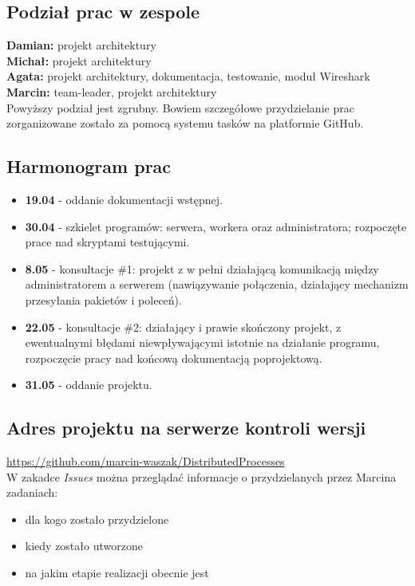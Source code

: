 \documentclass[paper=a4, fontsize=11pt]{scrartcl} %
\begin{document}
\subsection{Podział prac w zespole}
\textbf{Damian:} projekt architektury \\
\textbf{Michał:} projekt architektury \\
\textbf{Agata:} projekt architektury, dokumentacja, testowanie, moduł Wireshark \\
\textbf{Marcin:} team-leader, projekt architektury \\

Powyższy podział jest zgrubny. Bowiem szczegółowe przydzielanie prac zorganizowane zostało za pomocą systemu tasków na platformie GitHub.

\subsection{Harmonogram prac}
\begin{itemize}
\item \textbf{19.04} - oddanie dokumentacji wstępnej. 
\item \textbf{30.04} - szkielet programów: serwera, workera oraz administratora;  rozpoczęte prace nad skryptami testującymi. 
\item \textbf{8.05} - konsultacje \#1: projekt z w pełni działającą komunikacją między administratorem a serwerem (nawiązywanie połączenia, działający mechanizm przesyłania pakietów i poleceń). 
\item \textbf{22.05} - konsultacje \#2: działający i prawie skończony projekt, z ewentualnymi błędami niewpływającymi istotnie na działanie programu, rozpoczęcie pracy nad końcową dokumentacją poprojektową. 
\item \textbf{31.05} - oddanie projektu.
\end{itemize}

\subsection{Adres projektu na serwerze kontroli wersji}
\url{https://github.com/marcin-waszak/DistributedProcesses}  \\

W zakadce \textit{Issues} można przeglądać informacje o przydzielanych przez Marcina zadaniach: 
\begin{itemize}
\item dla kogo zostało przydzielone
\item kiedy zostało utworzone
\item na jakim etapie realizacji obecnie jest
\end{itemize}
\end{document}
